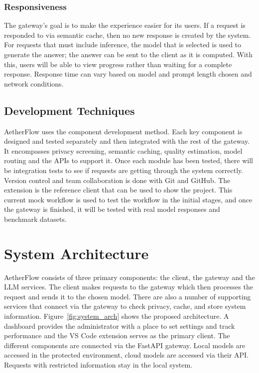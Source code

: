 \documentclass{FastFyp}
\begin{document}
\subsubsection{Responsiveness}

The gateway's goal is to make the experience easier for its users. If a request is responded to via semantic cache, then no new response is created by the system. For requests that must include inference, the model that is selected is used to generate the answer; the answer can be sent to the client as it is computed. With this, users will be able to view progress rather than waiting for a complete response. Response time can vary based on model and prompt length chosen and network conditions.

\subsection{Development Techniques}

AetherFlow uses the component development method. Each key component is designed and tested separately and then integrated with the rest of the gateway. It encompasses privacy screening, semantic caching, quality estimation, model routing and the APIs to support it. Once each module has been tested, there will be integration tests to see if requests are getting through the system correctly.
Version control and team collaboration is done with Git and GitHub. The extension is the reference client that can be used to show the project. This current mock workflow is used to test the workflow in the initial stages, and once the gateway is finished, it will be tested with real model responses and benchmark datasets.

\section{System Architecture}

AetherFlow consists of three primary components: the client, the gateway and the LLM services. The client makes requests to the gateway which then processes the request and sends it to the chosen model. There are also a number of supporting services that connect via the gateway to check privacy, cache, and store system information.
Figure~\ref{fig:system_arch} shows the proposed architecture. A dashboard provides the administrator with a place to set settings and track performance and the VS Code extension serves as the primary client. The different components are connected via the FastAPI gateway. Local models are accessed in the protected environment, cloud models are accessed via their API. Requests with restricted information stay in the local system.
\end{document}
